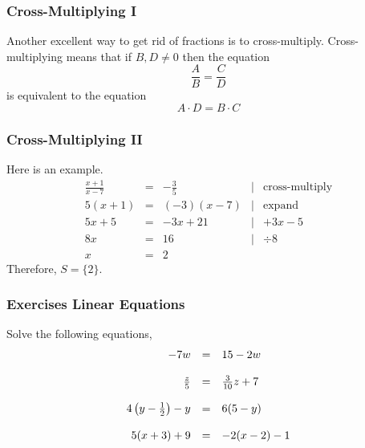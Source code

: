 \documentclass[xcolor=dvipsnames]{beamer}
\begin{document}
\begin{frame}
  \frametitle{Cross-Multiplying I}
Another excellent way to get rid of fractions is to cross-multiply.
Cross-multiplying means that if $B,D\neq{}0$ then the equation
\begin{equation}
  \label{eq:queighaw}
  \frac{A}{B}=\frac{C}{D}
\end{equation}
is equivalent to the equation
\begin{equation}
  \label{eq:maipahlu}
  A\cdot{}D=B\cdot{}C
\end{equation}
\end{frame}

\begin{frame}
  \frametitle{Cross-Multiplying II}
Here is an example.
\begin{equation}
  \label{eq:oucaedoo}
  \begin{array}{rclcl}
    \frac{x+1}{x-7}&=&-\frac{3}{5}&|&\mbox{cross-multiply} \\
    5(x+1)&=&(-3)(x-7)&|&\mbox{expand} \\
    5x+5&=&-3x+21&|&+3x-5 \\
    8x&=&16&|&\div{}8 \\
    x&=&2&&
  \end{array}
\end{equation}
Therefore, $S=\{2\}$.
\end{frame}

\begin{frame}
  \frametitle{Exercises Linear Equations}
{\ubung} Solve the following equations,
\begin{equation}
  \label{eq:jeireise}
  \begin{array}{rcl}
    -7w&=&15-2w \\ 
    \hspace{.5in} && \\
    \frac{z}{5}&=&\frac{3}{10}z+7 \\ 
    \hspace{.5in} && \\
    4\left(y-\frac{1}{2}\right)-y&=&6(5-y) \\ 
    \hspace{.5in} && \\
    5(x+3)+9&=&-2(x-2)-1
  \end{array}
\end{equation}
\end{frame}
\end{document}
